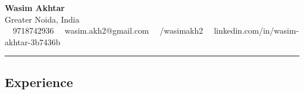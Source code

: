 \documentclass[11pt,letterpaper]{article}
\begin{document}
\begin{center}
	{\LARGE \textbf{Wasim Akhtar}}\\
	Greater Noida, India
	\vspace{0.05cm}
	\\
	\raisebox{-0.2\height} {\Large \faPhoneSquare} \ \  9718742936 \hfill\raisebox{-0.2\height}{\Large \faEnvelopeSquare} \ \ wasim.akh2@gmail.com \hfill \raisebox{-0.2\height}{\Large \faGithubSquare} \ \ /wasimakh2 \hfill \raisebox{-0.2\height}{\Large \faLinkedinSquare} \ \ linkedin.com/in/wasim-akhtar-3b7436b
\end{center}

\hrule
\vspace{-1em}
\subsection*{\Large Experience}
\end{document}

